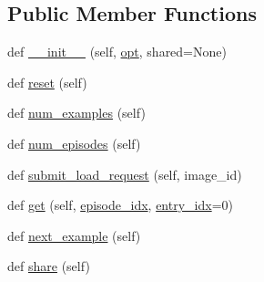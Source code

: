 \subsection*{Public Member Functions}
\begin{DoxyCompactItemize}
\item 
def \hyperlink{classparlai_1_1tasks_1_1vqa__v1_1_1agents_1_1OeTeacher_a508a90334629ef603b9520a98b5200a0}{\+\_\+\+\_\+init\+\_\+\+\_\+} (self, \hyperlink{classparlai_1_1core_1_1agents_1_1Teacher_a3ce6243860ce978a897922863ed32fa4}{opt}, shared=None)
\item 
def \hyperlink{classparlai_1_1tasks_1_1vqa__v1_1_1agents_1_1OeTeacher_a5541625a47721863f58db94177ce1114}{reset} (self)
\item 
def \hyperlink{classparlai_1_1tasks_1_1vqa__v1_1_1agents_1_1OeTeacher_acc1841e8be4613043d9674d014e06f70}{num\+\_\+examples} (self)
\item 
def \hyperlink{classparlai_1_1tasks_1_1vqa__v1_1_1agents_1_1OeTeacher_aa932b35d88d65d7f5d61b271bbee71ac}{num\+\_\+episodes} (self)
\item 
def \hyperlink{classparlai_1_1tasks_1_1vqa__v1_1_1agents_1_1OeTeacher_aed7f88bcef1e901e87d0a947d180586f}{submit\+\_\+load\+\_\+request} (self, image\+\_\+id)
\item 
def \hyperlink{classparlai_1_1tasks_1_1vqa__v1_1_1agents_1_1OeTeacher_a932ca5499779ef050d1fdb605c9e7f67}{get} (self, \hyperlink{classparlai_1_1core_1_1teachers_1_1FixedDialogTeacher_afd4ebab8063eb42d182d30a1a41f133e}{episode\+\_\+idx}, \hyperlink{classparlai_1_1core_1_1teachers_1_1FixedDialogTeacher_ae3201b15f3c3b46a2f3511bad9b43e7d}{entry\+\_\+idx}=0)
\item 
def \hyperlink{classparlai_1_1tasks_1_1vqa__v1_1_1agents_1_1OeTeacher_a42df8da64edbf22fcc976b1cd02ef252}{next\+\_\+example} (self)
\item 
def \hyperlink{classparlai_1_1tasks_1_1vqa__v1_1_1agents_1_1OeTeacher_ae61f906342533a155cfbcad318657ce9}{share} (self)
\end{DoxyCompactItemize}
